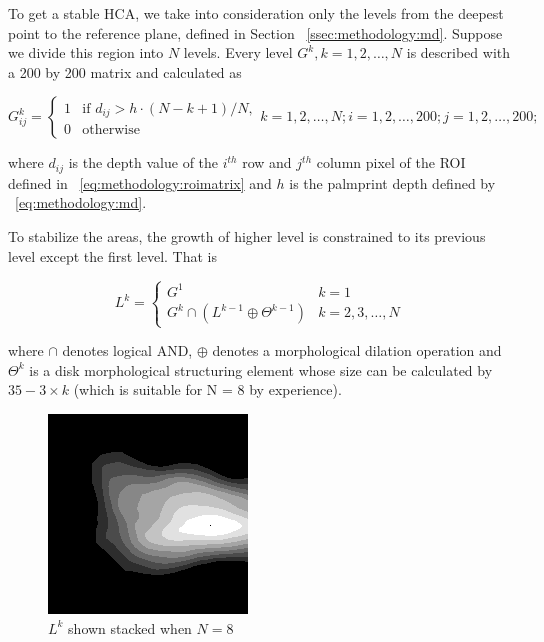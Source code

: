 To get a stable HCA, we take into consideration only the levels from the deepest point to the reference plane, defined in Section ~\ref{ssec:methodology:md}. Suppose we divide this region into $N$ levels. Every level $G^k, k=1,2,\dots,N$ is described with a 200 by 200 matrix and calculated as

\begin{equation}
G^k_{ij} =
\begin{cases}
1 & \text{if } d_{ij}>h\cdot(N-k+1)/N,\\
0 & \text{otherwise}
\end{cases}
k=1,2,\dots,N;i=1,2,\dots,200;j=1,2,\dots,200;
\end{equation}

where $d_{ij}$ is the depth value of the $i^{th}$ row and $j^{th}$ column pixel of the ROI defined in ~\ref{eq:methodology:roimatrix} and $h$ is the palmprint depth defined by ~\ref{eq:methodology:md}.

To stabilize the areas, the growth of higher level is constrained to its previous level except the first level. That is

\begin{equation}
L^k=
\begin{cases}
G^1                             & k=1 \\
G^k \cap (L^{k-1} \oplus \Theta^{k-1}) & k=2,3,\dots,N
\end{cases}
\end{equation}

where $\cap$ denotes logical AND, $\oplus$ denotes a morphological dilation operation and  $\Theta^{k}$ is a disk morphological structuring element whose size can be calculated by $35-3 \times k$ (which is suitable for N = 8 by experience).

\begin{figure}[htb]
\begin{center}
\includegraphics[width=0.9\linewidth]{ch-methodology/figures/hcastack}
\caption[$L^k$ shown stacked when $N=8$]{$L^k$ shown stacked when $N=8$}
\label{fig:methodology:hcastack}
\end{center}
\end{figure}

